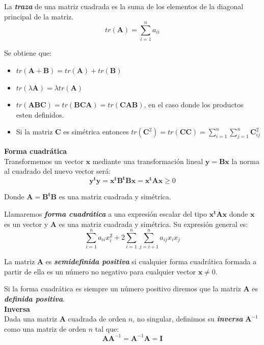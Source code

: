 \documentclass[12pt,letterpaper]{report} %
\begin{document}
La \textit{\textbf{traza}} de una matriz cuadrada es la suma de los elementos de la diagonal principal de la matriz.
$$tr(\mathbf{A})=\sum_{i=1}^{n}a_{ii}$$

Se obtiene que:
\begin{itemize}
\item  $tr(\mathbf{A}+\mathbf{B})=tr(\mathbf{A})+tr(\mathbf{B})$
\item $tr(\lambda\mathbf{A})=\lambda tr(\mathbf{A})$
\item $tr(\mathbf{A}\mathbf{B}\mathbf{C})=tr(\mathbf{B}\mathbf{C}\mathbf{A})=tr(\mathbf{C}\mathbf{A}\mathbf{B})$, en el caso donde los productos esten definidos.
\item Si la matriz $\mathbf{C}$ es simétrica entonces $tr(\mathbf{C}^2)=tr(\mathbf{C}\mathbf{C})=\sum_{i=1}^{n}\sum_{j=1}^{n}\mathbf{C}_{ij}^2$
\end{itemize} 

\textbf{Forma cuadrática} \\

Transformemos un vector $\mathbf{x}$ mediante una transformación lineal $\mathbf{y}=\mathbf{Bx}$ la norma al cuadrado del nuevo vector será:
$$\mathbf{y^ty}=\mathbf{x^tB^tBx}=\mathbf{x^tAx}\ge 0$$

Donde $\mathbf{A}=\mathbf{B^tB}$ es una matriz cuadrada y simétrica.

Llamaremos \textit{\textbf{forma cuadrática}} a una expresión escalar del tipo $\mathbf{x^t\mathbf{A}x}$ donde $\mathbf{x}$ es un vector y $\mathbf{A}$ es una matriz cuadrada y simétrica. Su expresión general es:
$$\sum_{i=1}^{n} a_{ii}x_{i}^2 + 2\sum_{i=1}^{n}\sum_{j=i+1}^{n}a_{ij}x_{i}x_{j}$$

La matriz $\mathbf{A}$ es \textit{\textbf{semidefinida positiva}} si cualquier forma cuadrática formada a partir de ella es un número no negativo para cualquier vector $\mathbf{x}\ne 0$.

Si la forma cuadrática es siempre un número positivo diremos que la matriz $\mathbf{A}$ es \textit{\textbf{definida positiva}}. \\

\textbf{Inversa}
\\

Dada una matriz $\mathbf{A}$ cuadrada de orden $n$, no singular, definimos su \textit{\textbf{inversa}} $\mathbf{A}^{-1}$ como una matriz de orden $n$ tal que:
$$\mathbf{A}\mathbf{A}^{-1}=\mathbf{A}^{-1}\mathbf{A}= \mathbf{I}$$
\end{document}
